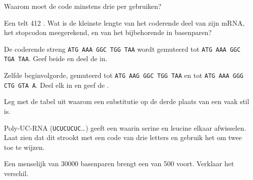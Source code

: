 \begin{exercise}[$\star$]\label{exo:g11:gene-expression:5}
Waarom moet de code minstens drie  per  gebruiken?
\end{exercise}

\begin{exercise}[$\star\star$]\label{exo:g11:gene-expression:6}
Een  telt 412 . Wat is de kleinste lengte van het
coderende deel van zijn mRNA, het stopcodon meegerekend, en van het
bijbehorende  in basenparen?
\end{exercise}

\begin{exercise}[$\star\star$]\label{exo:g11:gene-expression:7}
De coderende streng \texttt{ATG AAA GGC TGG TAA} wordt gemuteerd tot
\texttt{ATG AAA GGC TGA TAA}. Geef beide  en deel de  in.
\end{exercise}

\begin{exercise}[$\star\star$]\label{exo:g11:gene-expression:8}
Zelfde beginvolgorde, gemuteerd tot \texttt{ATG AAG GGC TGG TAA} en tot
\texttt{ATG AAA GGG CTG GTA A}. Deel elk in en geef de .
\end{exercise}

\begin{exercise}[$\star\star$]\label{exo:g11:gene-expression:9}
Leg met de tabel uit waarom een substitutie op de derde plaats van een
 vaak stil is.
\end{exercise}

\begin{exercise}[$\star\star$]\label{exo:g11:gene-expression:10}
Poly-UC-RNA (\texttt{UCUCUCUC}\dots) geeft een  waarin serine en
leucine elkaar afwisselen. Laat zien dat dit strookt met een code van
drie letters en gebruik het om twee  toe te wijzen.
\end{exercise}

\begin{exercise}[$\star\star$]\label{exo:g11:gene-expression:11}
Een menselijk  van \num{30000} basenparen brengt een  van 500
 voort. Verklaar het verschil.
\end{exercise}


